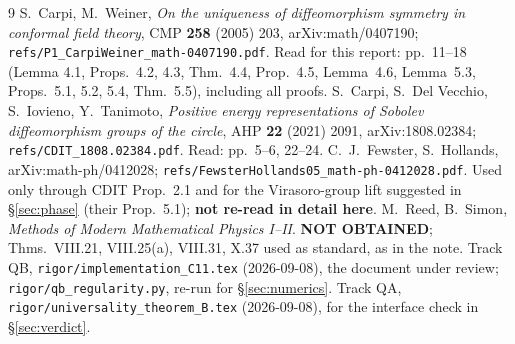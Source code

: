 \documentclass[11pt]{article}
\begin{document}
\begin{thebibliography}{9}
 S.~Carpi, M.~Weiner, \emph{On the uniqueness of diffeomorphism symmetry in conformal field
theory}, CMP \textbf{258} (2005) 203, arXiv:math/0407190; \texttt{refs/P1\_CarpiWeiner\_math-0407190.pdf}.
Read for this report: pp.~11--18 (Lemma 4.1, Props.~4.2, 4.3, Thm.~4.4, Prop.~4.5, Lemma~4.6, Lemma~5.3,
Props.~5.1, 5.2, 5.4, Thm.~5.5), including all proofs.
 S.~Carpi, S.~Del Vecchio, S.~Iovieno, Y.~Tanimoto, \emph{Positive energy representations of
Sobolev diffeomorphism groups of the circle}, AHP \textbf{22} (2021) 2091, arXiv:1808.02384;
\texttt{refs/CDIT\_1808.02384.pdf}.  Read: pp.~5--6, 22--24.
 C.~J.~Fewster, S.~Hollands, arXiv:math-ph/0412028;
\texttt{refs/FewsterHollands05\_math-ph-0412028.pdf}.  Used only through CDIT Prop.~2.1 and for the
Virasoro-group lift suggested in \S\ref{sec:phase} (their Prop.~5.1); \textbf{not re-read in detail here}.
 M.~Reed, B.~Simon, \emph{Methods of Modern Mathematical Physics I--II}.  \textbf{NOT OBTAINED};
Thms.~VIII.21, VIII.25(a), VIII.31, X.37 used as standard, as in the note.
 Track QB, \texttt{rigor/implementation\_C11.tex} (2026-09-08), the document under review;
\texttt{rigor/qb\_regularity.py}, re-run for \S\ref{sec:numerics}.
 Track QA, \texttt{rigor/universality\_theorem\_B.tex} (2026-09-08), for the interface check in
\S\ref{sec:verdict}.
\end{thebibliography}
\end{document}
